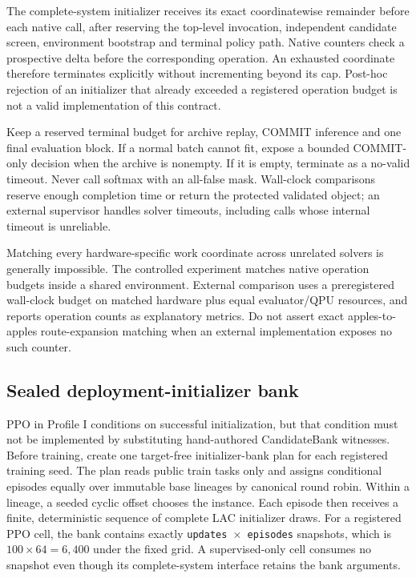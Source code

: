 \documentclass[11pt,a4paper]{article}
\newcommand{\code}[1]{\texttt{\small #1}}
\theoremstyle{definition}\newtheorem{definition}[proposition]{Definition}
\begin{document}
The complete-system initializer receives its exact coordinatewise remainder before each native call, after reserving the top-level invocation, independent candidate screen, environment bootstrap and terminal policy path. Native counters check a prospective delta before the corresponding operation. An exhausted coordinate therefore terminates explicitly without incrementing beyond its cap. Post-hoc rejection of an initializer that already exceeded a registered operation budget is not a valid implementation of this contract.

Keep a reserved terminal budget for archive replay, COMMIT inference and one final evaluation block. If a normal batch cannot fit, expose a bounded COMMIT-only decision when the archive is nonempty. If it is empty, terminate as a no-valid timeout. Never call softmax with an all-false mask. Wall-clock comparisons reserve enough completion time or return the protected validated object; an external supervisor handles solver timeouts, including calls whose internal timeout is unreliable.

Matching every hardware-specific work coordinate across unrelated solvers is generally impossible. The controlled experiment matches native operation budgets inside a shared environment. External comparison uses a preregistered wall-clock budget on matched hardware plus equal evaluator/QPU resources, and reports operation counts as explanatory metrics. Do not assert exact apples-to-apples route-expansion matching when an external implementation exposes no such counter.

\subsection{Sealed deployment-initializer bank}
PPO in Profile I conditions on successful initialization, but that condition must not be implemented by substituting hand-authored CandidateBank witnesses. Before training, create one target-free initializer-bank plan for each registered training seed. The plan reads public train tasks only and assigns conditional episodes equally over immutable base lineages by canonical round robin. Within a lineage, a seeded cyclic offset chooses the instance. Each episode then receives a finite, deterministic sequence of complete LAC initializer draws. For a registered PPO cell, the bank contains exactly \code{updates $\times$ episodes} snapshots, which is $100\times64=6{,}400$ under the fixed grid. A supervised-only cell consumes no snapshot even though its complete-system interface retains the bank arguments.
\end{document}
